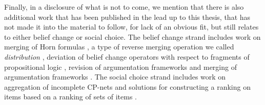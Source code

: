 Finally, in a disclosure of what is not to come,
we mention that there is also additional work 
that has been published in the lead up to 
this thesis, that has not made it into the material to follow,
for lack of an obvious fit, but still relates
to either belief change or social choice. 
The belief change strand includes work on 
merging of Horn formulas \cite{HaretRW15,HaretRW17}, 
a type of reverse merging operation we called \emph{distribution} \cite{HaretMW16},
deviation of belief change operators with respect to fragments of propositional logic \cite{HaretW17},
revision of argumentation frameworks \cite{DillerHLRW15,DillerHLRW18}
and merging of argumentation frameworks \cite{DelobelleHKMRW16}.
The social choice strand includes work on
aggregation of incomplete CP-nets \cite{HaretNG18}
and solutions for constructing a ranking on items based on a ranking of sets 
of items \cite{HaretKMO18}.
